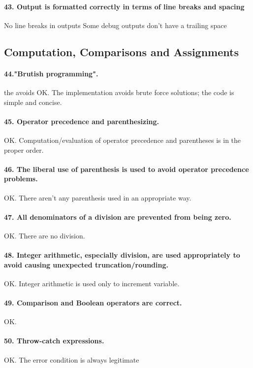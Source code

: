 \documentclass[english]{article}
\begin{document}
\paragraph{43. Output is formatted correctly in terms of line breaks and spacing}
No line breaks in outputs
Some debug outputs don't have a trailing space ~

\subsection{Computation, Comparisons and Assignments}
\paragraph{44."Brutish programming".}the  avoids
OK. The implementation avoids brute force solutions; the code is simple and concise.

\paragraph{45. Operator precedence and parenthesizing.}
OK. Computation/evaluation of operator precedence and parentheses is in the proper order.
 
\paragraph{46. The liberal use of parenthesis is used to avoid operator precedence problems.}
OK. There aren't any parenthesis used in an appropriate way.

\paragraph{47. All denominators of a division are prevented from being zero.}
OK. There are no division.

\paragraph{48. Integer arithmetic, especially division, are used appropriately to avoid causing unexpected truncation/rounding.}
OK. Integer arithmetic is used only to increment variable.

\paragraph{49. Comparison and Boolean operators are correct.}
OK.

\paragraph{50. Throw-catch expressions.}
OK. The error condition is always legitimate
\end{document}
